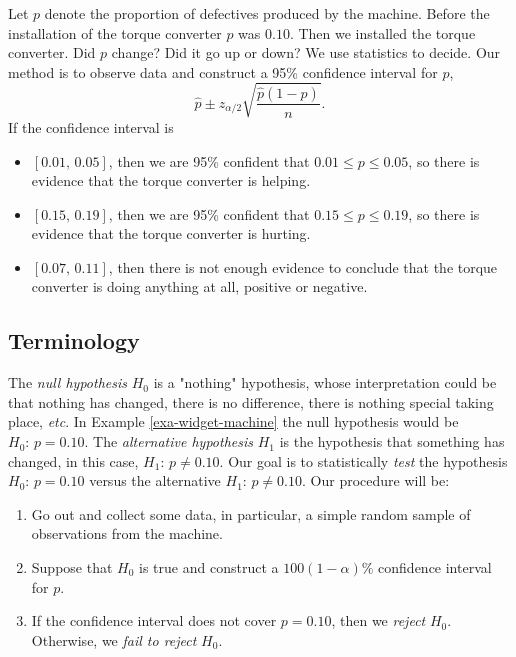 Let \(p\) denote the proportion of defectives produced by the
machine. Before the installation of the torque converter \(p\) was
\(0.10\). Then we installed the torque converter. Did \(p\) change?
Did it go up or down? We use statistics to decide. Our method is to
observe data and construct a 95\% confidence interval for \(p\),
\begin{equation}
\hat{p} \pm z_{\alpha/2}\sqrt{\frac{\hat{p}(1 - \hat{p})}{n}}.
\end{equation}
If the confidence interval is 
\begin{itemize}
\item \([0.01,\,0.05]\), then we are 95\% confident that \(0.01\leq
  p \leq 0.05\), so there is evidence that the torque converter is
helping.
\item \([0.15,\,0.19]\), then we are 95\% confident that \(0.15\leq
  p \leq 0.19\), so there is evidence that the torque converter is
hurting.
\item \([0.07,\,0.11]\), then there is not enough evidence to conclude
that the torque converter is doing anything at all, positive or
negative.
\end{itemize}

\subsection{Terminology}
\label{sec-10-2-1}

The \emph{null hypothesis} \(H_{0}\) is a "nothing" hypothesis, whose
interpretation could be that nothing has changed, there is no
difference, there is nothing special taking place, \emph{etc}. In Example
\ref{exa-widget-machine} the null hypothesis would be \(H_{0}:\, p = 0.10.\)
The \emph{alternative hypothesis} \(H_{1}\) is the hypothesis that
something has changed, in this case, \(H_{1}:\, p \neq 0.10\). Our
goal is to statistically \emph{test} the hypothesis \(H_{0}:\, p = 0.10\)
versus the alternative \(H_{1}:\, p \neq 0.10\). Our procedure will
be:
\begin{enumerate}
\item Go out and collect some data, in particular, a simple random sample
of observations from the machine.
\item Suppose that \(H_{0}\) is true and construct a \(100(1-\alpha)\%\)
   confidence interval for \(p\).
\item If the confidence interval does not cover \(p = 0.10\), then we
\emph{reject} \(H_{0}\). Otherwise, we \emph{fail to reject} \(H_{0}\).
\end{enumerate}

